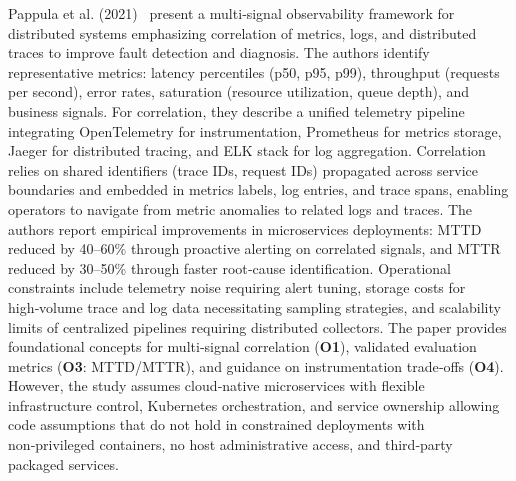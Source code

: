 \documentclass[12pt]{article}
\begin{document}
Pappula et al. (2021)~\cite{pappula2021building} present a multi‑signal observability framework for distributed systems emphasizing correlation of metrics, logs, and distributed traces to improve fault detection and diagnosis. The authors identify representative metrics: latency percentiles (p50, p95, p99), throughput (requests per second), error rates, saturation (resource utilization, queue depth), and business signals. For correlation, they describe a unified telemetry pipeline integrating OpenTelemetry for instrumentation, Prometheus for metrics storage, Jaeger for distributed tracing, and ELK stack for log aggregation. Correlation relies on shared identifiers (trace IDs, request IDs) propagated across service boundaries and embedded in metrics labels, log entries, and trace spans, enabling operators to navigate from metric anomalies to related logs and traces. The authors report empirical improvements in microservices deployments: \ac{MTTD} reduced by 40–60\% through proactive alerting on correlated signals, and \ac{MTTR} reduced by 30–50\% through faster root‑cause identification. Operational constraints include telemetry noise requiring alert tuning, storage costs for high‑volume trace and log data necessitating sampling strategies, and scalability limits of centralized pipelines requiring distributed collectors. The paper provides foundational concepts for multi‑signal correlation (\textbf{O1}), validated evaluation metrics (\textbf{O3}: \ac{MTTD}/\ac{MTTR}), and guidance on instrumentation trade‑offs (\textbf{O4}). However, the study assumes cloud‑native microservices with flexible infrastructure control, Kubernetes orchestration, and service ownership allowing code assumptions that do not hold in constrained deployments with non‑privileged containers, no host administrative access, and third‑party packaged services.
\end{document}
